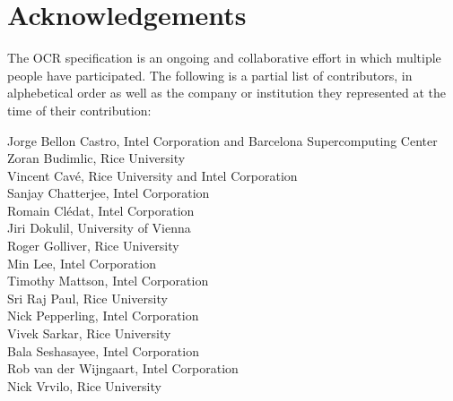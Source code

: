 \chapter*{Acknowledgements}
The OCR specification is an ongoing and collaborative effort in which
multiple people have participated. The following is a partial list of
contributors, in alphebetical order as well as the company or
institution they represented at the time of their contribution:

Jorge Bellon Castro, Intel Corporation and Barcelona Supercomputing Center\\
Zoran Budimlic, Rice University\\
Vincent Cav\'e, Rice University and Intel Corporation\\
Sanjay Chatterjee, Intel Corporation\\
Romain Cl\'edat, Intel Corporation\\
Jiri Dokulil, University of Vienna\\
Roger Golliver, Rice University\\
Min Lee, Intel Corporation\\
Timothy Mattson, Intel Corporation\\
Sri Raj Paul, Rice University\\
Nick Pepperling, Intel Corporation\\
Vivek Sarkar, Rice University\\
Bala Seshasayee, Intel Corporation\\
Rob van der Wijngaart, Intel Corporation\\
Nick Vrvilo, Rice University\\
